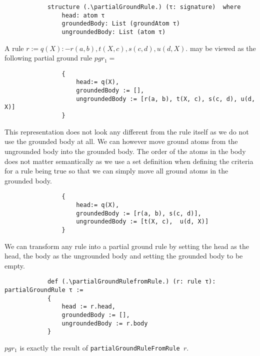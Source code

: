         \begin{lstlisting}
            structure (.\partialGroundRule.) (τ: signature)  where
                head: atom τ
                groundedBody: List (groundAtom τ)
                ungroundedBody: List (atom τ)
        \end{lstlisting}

        \begin{example}
            A rule $r := q(X) :- r(a, b), t(X, c), s(c, d), u(d, X) .$ may be viewed as the following partial ground rule
            $pgr_1 = $
            \begin{lstlisting}
                {
                    head:= q(X),
                    groundedBody := [],
                    ungroundedBody := [r(a, b), t(X, c), s(c, d), u(d, X)]
                }
            \end{lstlisting}
            
            This representation does not look any different from the rule itself as we do not use the grounded body at all. We can however move ground atoms from the ungrounded body into the grounded body. The order of the atoms in the body does not matter semantically as we use a set definition when defining the criteria for a rule being true so that we can simply move all ground atoms in the grounded body.

            \begin{lstlisting}
                {
                    head:= q(X),
                    groundedBody := [r(a, b), s(c, d)],
                    ungroundedBody := [t(X, c),  u(d, X)]
                }
            \end{lstlisting}

        \end{example}

        We can transform any rule into a partial ground rule by setting the head as the head, the body as the ungrounded body and setting the grounded body to be empty.

        \begin{lstlisting}
            def (.\partialGroundRulefromRule.) (r: rule τ): partialGroundRule τ :=
            {
                head := r.head, 
                groundedBody := [],
                ungroundedBody := r.body
            }
        \end{lstlisting}

        \begin{example}
            $pgr_1$ is exactly the result of \texttt{partialGroundRuleFromRule $r$}.
        \end{example}


